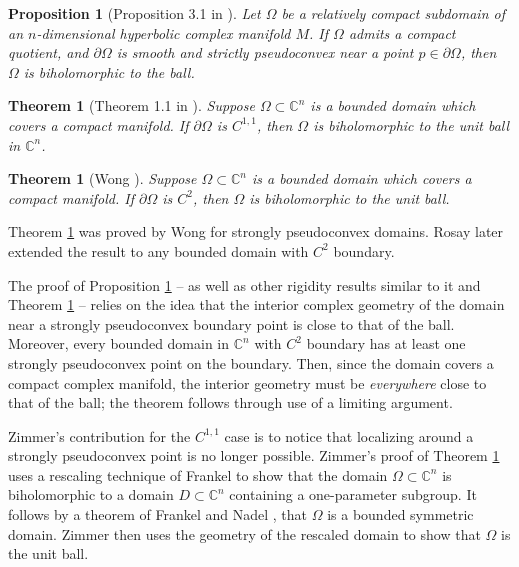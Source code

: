 \documentclass[12pt]{article}
\newcommand{\C}{\mathbb{C}}
\newtheorem{theorem}[lemma]{Theorem}
\newtheorem{proposition}[lemma]{Proposition}
\begin{document}
\begin{proposition}[Proposition 3.1 in \cite{CFKW}]
\label{CFKWProp3.1}
Let $\Omega$ be a relatively compact subdomain of an $n$-dimensional hyperbolic complex manifold $M$. If $\Omega$ admits a compact quotient, and $\partial \Omega$ is smooth and strictly pseudoconvex near a point $p\in\partial \Omega$, then $\Omega$ is biholomorphic to the ball.
\end{proposition}

\begin{theorem}[Theorem 1.1 in \cite{Zimmer}]
\label{ZimThm1.1}
Suppose $\Omega\subset\C^n$ is a bounded domain which covers a compact manifold. If $\partial\Omega$ is $C^{1,1}$, then $\Omega$ is biholomorphic to the unit ball in $\C^n$.
\end{theorem}

\begin{theorem}[Wong \cite{Wong77}]
\label{WongC2}
Suppose $\Omega\subset\C^n$ is a bounded domain which covers a compact manifold. If $\partial\Omega$ is $C^2$, then $\Omega$ is biholomorphic to the unit ball.
\end{theorem}

Theorem \ref{WongC2} was proved by Wong for strongly pseudoconvex domains. Rosay \cite{Rosay} later extended the result to any bounded domain with $C^2$ boundary.

The proof of Proposition \ref{CFKWProp3.1} -- as well as other rigidity results similar to it and Theorem \ref{WongC2} -- relies on the idea that the interior complex geometry of the domain near a strongly pseudoconvex boundary point is close to that of the ball. Moreover, every bounded domain in $\C^n$ with $C^2$ boundary has at least one strongly pseudoconvex point on the boundary. Then, since the domain covers a compact complex manifold, the interior geometry must be \textit{everywhere} close to that of the ball; the theorem follows through use of a limiting argument.

Zimmer's contribution for the $C^{1,1}$ case is to notice that localizing around a strongly pseudoconvex point is no longer possible. Zimmer's proof of Theorem \ref{ZimThm1.1} uses a rescaling technique of Frankel \cite{Frankel89} to show that the domain $\Omega\subset\C^n$ is biholomorphic to a domain $D\subset\C^n$ containing a one-parameter subgroup. It follows by a theorem of Frankel and Nadel \cite{Frankel}, \cite{Nadel} that $\Omega$ is a bounded symmetric domain. Zimmer then uses the geometry of the rescaled domain to show that $\Omega$ is the unit ball. 
\end{document}
